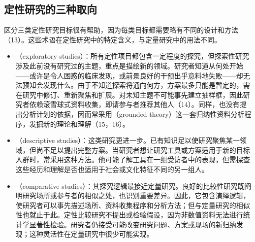 \subsection{定性研究的三种取向}
区分三类定性研究目标很有帮助，因为每类目标都需要略有不同的设计和方法（13）。这些术语在定性研究中的特定含义，与定量研究中的用法不同。
\begin{itemize}
\item {}（exploratory studies）：所有定性项目都包含一定程度的探究，但探索性研究涉及此前没有研究过的主题，重点是描绘新的领域。研究者知道从何处开始——或许是令人困惑的临床发现，或前景良好的干预出乎意料地失败——却无法预知会发现什么。由于不知道探索将通向何方，方案最多只能是暂定的，需在研究中修订、重新聚焦和扩展。对未知主题不可能事先建立抽样框，因此研究者依赖滚雪球式资料收集，即请参与者推荐其他人（14）。同样，也没有提出分析计划的依据，因而常采用（grounded theory）这一套归纳性资料分析程序，发掘新的理论和理解（15，16）。
\item {}（descriptive studies）：这类研究更进一步。已有知识足以使研究聚焦某一领域，但尚不足以提出完整方案。当研究者想让研究工具或方案适用于新的目标人群时，常采用这种方法。他可能了解工具在一组受访者中的表现，但需探查这些经历和理解是否也适用于社会或文化特征不同的另一组人。
\item {}（comparative studies）：其探究逻辑最接近定量研究。良好的比较性研究既阐明研究场所或参与者的相似之处，也识别重要差异。因此，它包含演绎逻辑，使研究者可以事先描述场所、资料收集程序和分析方法；但与定量研究的相似性也就止于此。定性比较研究不提出或检验假设，因为非数值资料无法进行统计学显著性检验。研究者仍接受可能改变研究问题、方案或现场的新归纳发现；这种灵活性在定量研究中很少可能实现。
\end{itemize}


